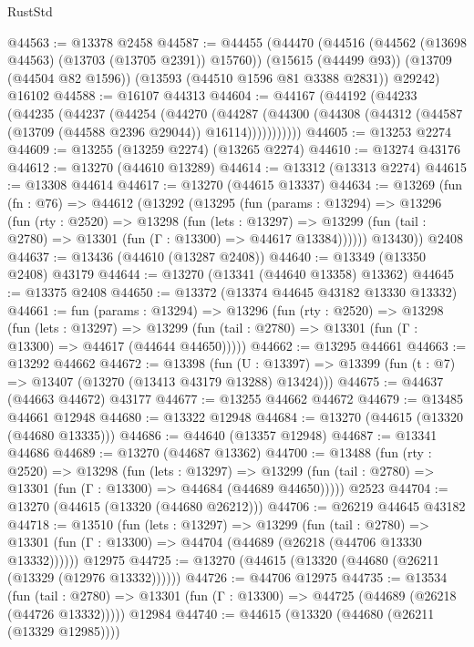 \begin{lexlean}{RustStd}
\begin{coremodule}
@44563 := @13378 @2458
@44587 := @44455
    (@44470
      (@44516 (@44562 (@13698 @44563) (@13703 (@13705 @2391)) @15760))
      (@15615 (@44499 @93))
      (@13709 (@44504 @82 @1596))
      (@13593 (@44510 @1596 @81 @3388 @2831))
      @29242)
    @16102
@44588 := @16107 @44313
@44604 := @44167
    (@44192
      (@44233
        (@44235
          (@44237
            (@44254
              (@44270
                (@44287
                  (@44300 (@44308 (@44312 (@44587 (@13709 (@44588 @2396 @29044)) @16114)))))))))))
@44605 := @13253 @2274
@44609 := @13255 (@13259 @2274) (@13265 @2274)
@44610 := @13274 @43176
@44612 := @13270 (@44610 @13289)
@44614 := @13312 (@13313 @2274)
@44615 := @13308 @44614
@44617 := @13270 (@44615 @13337)
@44634 := @13269
    (fun (fn : @76) =>
    @44612
      (@13292
        (@13295
          (fun (params : @13294) =>
          @13296
            (fun (rty : @2520) =>
            @13298
              (fun (lets : @13297) =>
              @13299 (fun (tail : @2780) => @13301 (fun (Γ : @13300) => @44617 @13384))))))
        @13430))
    @2408
@44637 := @13436 (@44610 (@13287 @2408))
@44640 := @13349 (@13350 @2408) @43179
@44644 := @13270 (@13341 (@44640 @13358) @13362)
@44645 := @13375 @2408
@44650 := @13372 (@13374 @44645 @43182 @13330 @13332)
@44661 := fun (params : @13294) =>
  @13296
    (fun (rty : @2520) =>
    @13298
      (fun (lets : @13297) =>
      @13299 (fun (tail : @2780) => @13301 (fun (Γ : @13300) => @44617 (@44644 @44650)))))
@44662 := @13295 @44661
@44663 := @13292 @44662
@44672 := @13398
    (fun (U : @13397) => @13399 (fun (t : @7) => @13407 (@13270 (@13413 @43179 @13288) @13424)))
@44675 := @44637 (@44663 @44672) @43177
@44677 := @13255 @44662 @44672
@44679 := @13485 @44661 @12948
@44680 := @13322 @12948
@44684 := @13270 (@44615 (@13320 (@44680 @13335)))
@44686 := @44640 (@13357 @12948)
@44687 := @13341 @44686
@44689 := @13270 (@44687 @13362)
@44700 := @13488
    (fun (rty : @2520) =>
    @13298
      (fun (lets : @13297) =>
      @13299 (fun (tail : @2780) => @13301 (fun (Γ : @13300) => @44684 (@44689 @44650)))))
    @2523
@44704 := @13270 (@44615 (@13320 (@44680 @26212)))
@44706 := @26219 @44645 @43182
@44718 := @13510
    (fun (lets : @13297) =>
    @13299
      (fun (tail : @2780) =>
      @13301 (fun (Γ : @13300) => @44704 (@44689 (@26218 (@44706 @13330 @13332))))))
    @12975
@44725 := @13270 (@44615 (@13320 (@44680 (@26211 (@13329 (@12976 @13332))))))
@44726 := @44706 @12975
@44735 := @13534
    (fun (tail : @2780) => @13301 (fun (Γ : @13300) => @44725 (@44689 (@26218 (@44726 @13332)))))
    @12984
@44740 := @44615 (@13320 (@44680 (@26211 (@13329 @12985))))

\end{coremodule}
\end{lexlean}
